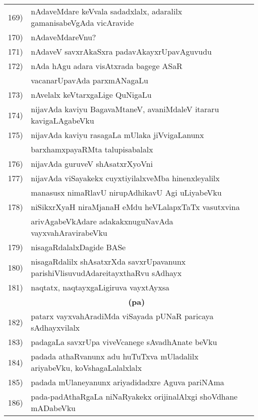 {\begin{longtable}{@{}cp{7.4cm}r}
169) & nAdaveMdare keVvala sadadxlalx, adaralilx gamanisabeVgAda vicAravide & \pageref{page169}\\
170) & nAdaveMdareVnu? & \pageref{page142}\\
171) & nAdaveV savxrAkaSxra padavAkayxrUpavAguvudu & \pageref{page141}\\
172) & nAda hAgu adara visAtxrada bagege ASaR & \\
     & vacanarUpavAda parxmANagaLu & \pageref{page144}\\
173) & nAvelalx keVtarxgaLige QuNigaLu & \pageref{page104}\\
174) & nijavAda kaviyu BagavaMtaneV, avaniMdaleV itararu kavigaLAgabeVku & \pageref{page239}\\
175) & nijavAda kaviyu rasagaLa mUlaka jiVvigaLanunx  & \pageref{page183}\\
     & barxhamxpayaRMta talupisabalalx & \pageref{page183}\\
176) & nijavAda guruveV shAsatxrXyoVni & \pageref{page68}\\
177) & nijavAda viSayakekx cuyxtiyilalxveMba hinenxleyalilx & \\
     & manasusx nimaRlavU nirupAdhikavU Agi uLiyabeVku & \pageref{page250}\\
178) & niSikxrXyaH niraMjanaH eMdu heVLalapxTaTx vasutxvina & \\
     & arivAgabeVkAdare adakakxnuguNavAda vayxvahAravirabeVku & \pageref{page202}\\
179) & nisagaRdalalxDagide BASe & \pageref{page6}\\
180) & nisagaRdalilx shAsatxrXda savxrUpavanunx parishiVlisuvudAdare\break itayxthaRvu sAdhayx & \pageref{page249}\\
181) & naqtatx, naqtayxgaLigiruva vayxtAyxsa & \pageref{page242}\\[0.3cm]
     &   \multicolumn{1}{c}{\textbf{(pa)}}  & \\[0.3cm]
182) & patarx vayxvahAradiMda viSayada pUNaR paricaya sAdhayxvilalx & \pageref{page30}\\
183) & padagaLa savxrUpa viveVcanege sAvadhAnate beVku & \pageref{page191}\\
184) & padada athaRvanunx adu huTuTxva mUladalilx ariyabeVku, koVshagaLalalxlalx & \pageref{page202}\\ 
185) & padada mUlaneyanunx ariyadidadxre Aguva pariNAma & \pageref{page186}\\
186) & pada-padAthaRgaLa niNaRyakekx orijinalAlxgi shoVdhane mADabeVku & \pageref{page215}\\

\end{longtable}}
